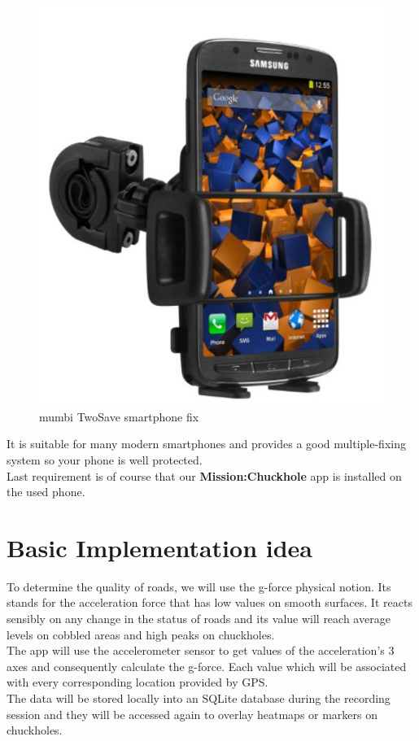 \documentclass[10pt,a4paper]{article} %
\begin{document}
	\begin{figure}[H]
		\begin{center}
 		  \includegraphics[scale=0.3]{smartphone_fix}
		  \caption{mumbi TwoSave smartphone fix}
		  \label{fig:smartphone_fix}
		\end{center}
	\end{figure}
	\noindent
	It is suitable for many modern smartphones and provides a good multiple-fixing system so your phone is well protected.\\
	Last requirement is of course that our \textbf{Mission:Chuckhole} app is installed on the used phone.


    \section{Basic Implementation idea}
	
	To determine the quality of roads, we will use the g-force physical notion. Its stands for the acceleration force that has low values on smooth surfaces. It reacts sensibly on any change in the status of roads and its value will reach average levels on cobbled areas and high peaks on chuckholes.\\
	The app will use the accelerometer sensor to get  values of the acceleration's 3 axes and consequently calculate the g-force. Each value which will be associated with every corresponding location provided by GPS.\\
	The data will be stored locally into an SQLite database during the recording session and they will be accessed again to overlay heatmaps or markers on chuckholes.
	
\end{document}
